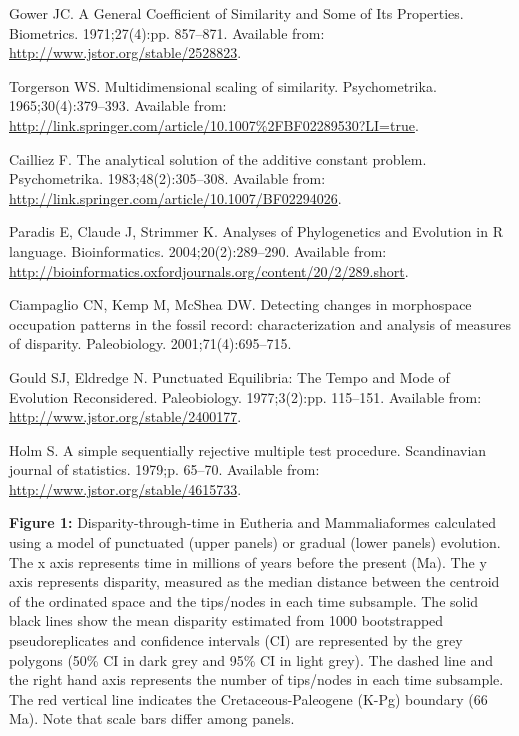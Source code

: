\documentclass[12pt,letterpaper]{article}
\begin{document}
\begin{thebibliography}{10}
Gower JC.
\newblock A General Coefficient of Similarity and Some of Its Properties.
\newblock Biometrics. 1971;27(4):pp. 857--871.
\newblock Available from: \url{http://www.jstor.org/stable/2528823}.

Torgerson WS.
\newblock Multidimensional scaling of similarity.
\newblock Psychometrika. 1965;30(4):379--393.
\newblock Available from:
  \url{http://link.springer.com/article/10.1007%2FBF02289530?LI=true}.

Cailliez F.
\newblock The analytical solution of the additive constant problem.
\newblock Psychometrika. 1983;48(2):305--308.
\newblock Available from:
  \url{http://link.springer.com/article/10.1007/BF02294026}.

Paradis E, Claude J, Strimmer K.
 Analyses of Phylogenetics and Evolution in {R} language.
\newblock Bioinformatics. 2004;20(2):289--290.
\newblock Available from:
  \url{http://bioinformatics.oxfordjournals.org/content/20/2/289.short}.

Ciampaglio CN, Kemp M, McShea DW.
\newblock Detecting changes in morphospace occupation patterns in the fossil
  record: characterization and analysis of measures of disparity.
\newblock Paleobiology. 2001;71(4):695--715.

Gould SJ, Eldredge N.
\newblock Punctuated {E}quilibria: The Tempo and Mode of Evolution
  Reconsidered.
\newblock Paleobiology. 1977;3(2):pp. 115--151.
\newblock Available from: \url{http://www.jstor.org/stable/2400177}.

Holm S.
\newblock A simple sequentially rejective multiple test procedure.
\newblock Scandinavian journal of statistics. 1979;p. 65--70.
\newblock Available from: \url{http://www.jstor.org/stable/4615733}.

\end{thebibliography}

\newpage

\noindent
\textbf{Figure 1:} Disparity-through-time in Eutheria and Mammaliaformes calculated using a model of punctuated (upper panels) or gradual (lower panels) evolution. The x axis represents time in millions of years before the present (Ma). The y axis represents disparity, measured as the median distance between the centroid of the ordinated space and the tips/nodes in each time subsample. The solid black lines show the mean disparity estimated from 1000 bootstrapped pseudoreplicates and confidence intervals (CI) are represented by the grey polygons (50\% CI in dark grey and 95\% CI in light grey). The dashed line and the right hand axis represents the number of tips/nodes in each time subsample. The red vertical line indicates the Cretaceous-Paleogene (K-Pg) boundary (66 Ma). Note that scale bars differ among panels.
\end{document}
